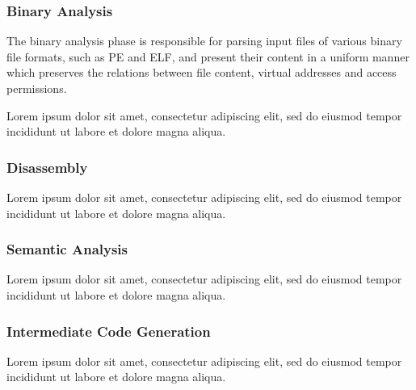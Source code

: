 \documentclass[12pt, a4paper]{article}
\begin{document}

\subsubsection{Binary Analysis}

The binary analysis phase is responsible for parsing input files of various binary file formats, such as PE and ELF, and present their content in a uniform manner which preserves the relations between file content, virtual addresses and access permissions.

Lorem ipsum dolor sit amet, consectetur adipiscing elit, sed do eiusmod tempor incididunt ut labore et dolore magna aliqua.


\subsubsection{Disassembly}


Lorem ipsum dolor sit amet, consectetur adipiscing elit, sed do eiusmod tempor incididunt ut labore et dolore magna aliqua.


\subsubsection{Semantic Analysis}

Lorem ipsum dolor sit amet, consectetur adipiscing elit, sed do eiusmod tempor incididunt ut labore et dolore magna aliqua.


\subsubsection{Intermediate Code Generation}

Lorem ipsum dolor sit amet, consectetur adipiscing elit, sed do eiusmod tempor incididunt ut labore et dolore magna aliqua.

\end{document}
